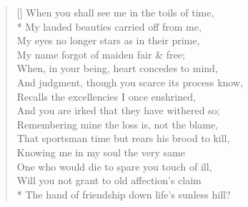 \documentclass[MAIN]{subfiles}
\begin{document}
\settowidth{\versewidth}{\vin And judgment, though you scarce its process know,}
\begin{verse}[\versewidth]
When you shall see me in the toils of time,\\*
\vin My lauded beauties carried off from me,\\
My eyes no longer stars as in their prime,\\
\vin My name forgot of maiden fair \& free;\\
When, in your being, heart concedes to mind,\\
\vin And judgment, though you scarce its process know,\\
Recalls the excellencies I once enshrined,\\
\vin And you are irked that they have withered so;\\
Remembering mine the loss is, not the blame,\\
\vin That sportsman time but rears his brood to kill,\\
Knowing me in my soul the very same\\
\vin One who would die to spare you touch of ill,\\
Will you not grant to old affection's claim\\*
\vin The hand of friendship down life's sunless hill?
\end{verse}
\end{document}
